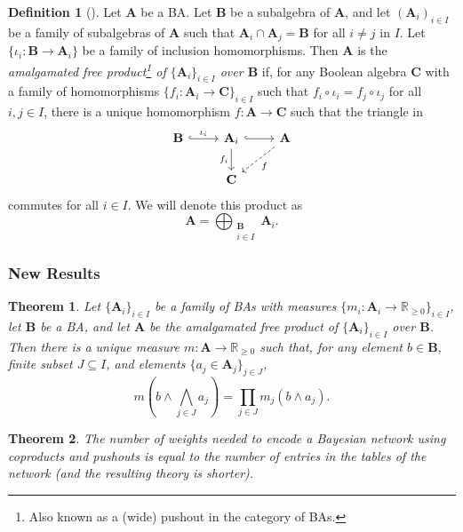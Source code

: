 \documentclass{article}
\newtheorem{theorem}{Theorem}
\theoremstyle{definition}
\newtheorem{definition}{Definition}
\theoremstyle{remark}
\begin{document}
\begin{definition}[\cite{koppelberg1989handbook}]
  Let $\mathbf{A}$ be a BA. Let $\mathbf{B}$ be a subalgebra of $\mathbf{A}$,
  and let $(\mathbf{A}_i)_{i \in I}$ be a family of subalgebras of $\mathbf{A}$
  such that $\mathbf{A}_i \cap \mathbf{A}_j = \mathbf{B}$ for all $i \ne j$ in
  $I$. Let $\{ \iota_i \colon \mathbf{B} \to \mathbf{A}_i \}$ be a family of
  inclusion homomorphisms. Then $\mathbf{A}$ is the \emph{amalgamated free
    product\footnote{Also known as a (wide) pushout in the category of BAs.} of
    $\{\mathbf{A}_{i} \}_{i \in I}$ over $\mathbf{B}$} if, for any Boolean
  algebra $\mathbf{C}$ with a family of homomorphisms $\{ f_i\colon \mathbf{A}_i
  \to \mathbf{C} \}_{i \in I}$ such that $f_i \circ \iota_i = f_j \circ \iota_j$
  for all $i, j \in I$, there is a unique homomorphism $f\colon \mathbf{A} \to
  \mathbf{C}$ such that the triangle in
  \[
    \begin{tikzcd}
      \mathbf{B} \ar[r,hookrightarrow,"\iota_i"] & \mathbf{A}_i
      \ar[r,hookrightarrow] \ar[d,swap,"f_i"] & \mathbf{A} \ar[ld,dashed,"f"] \\
      & \mathbf{C}
    \end{tikzcd}
  \]
  commutes for all $i \in I$. We will denote this product as
  \[
    \mathbf{A} = \bigoplus_{\substack{\mathbf{B}\\ i \in I}} \mathbf{A}_i.
  \]
\end{definition}

\subsubsection{New Results}

\begin{theorem}
  Let $\{ \mathbf{A}_i \}_{i \in I}$ be a family of BAs with measures $\{
  m_i\colon \mathbf{A}_i \to \mathbb{R}_{\ge 0} \}_{i \in I}$, let $\mathbf{B}$
  be a BA, and let $\mathbf{A}$ be the amalgamated free product of $\{
  \mathbf{A}_i \}_{i \in I}$ over $\mathbf{B}$. Then there is a unique measure
  $m\colon \mathbf{A} \to \mathbb{R}_{\ge 0}$ such that, for any element $b \in
  \mathbf{B}$, finite subset $J \subseteq I$, and elements $\{ a_j \in
  \mathbf{A}_j \}_{j \in J}$,
  \[
    m \left(b \land \bigwedge_{j \in J} a_j \right) = \prod_{j \in J} m_j(b
    \land a_j).
  \]
\end{theorem}

\begin{theorem}
  The number of weights needed to encode a Bayesian network using
  coproducts and pushouts is equal to the number of entries in the tables of the
  network (and the resulting theory is shorter).
\end{theorem}
\end{document}
